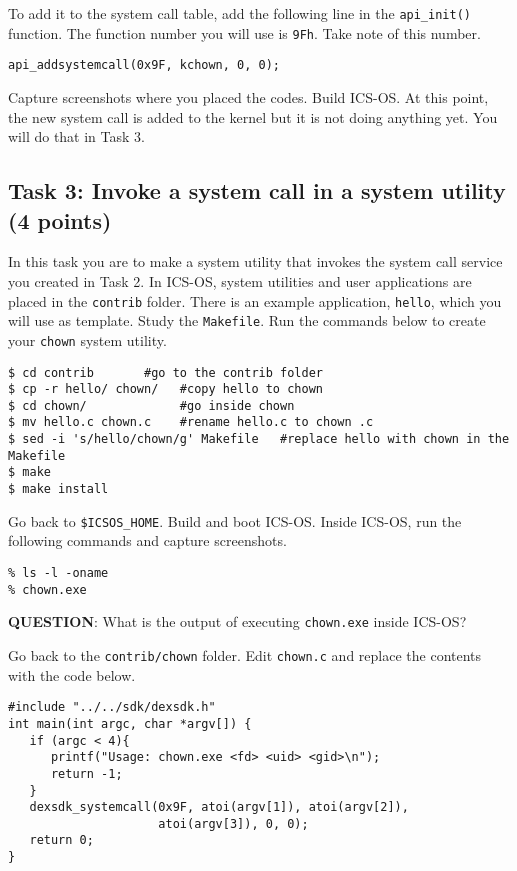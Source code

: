 \documentclass[a4paper, 11pt,oneside]{article}
\begin{document}
To add it to the system call table, add the following line in the \texttt{api\_init()} 
function. The function number you will use is \texttt{9Fh}. Take note of this number.

\begin{Verbatim}[frame=single]
api_addsystemcall(0x9F, kchown, 0, 0);
\end{Verbatim} 

Capture screenshots where you placed the codes. 
Build ICS-OS. At this point, the new system call is added to the kernel but it is not 
doing anything yet. You will do that in Task 3. 

\subsection*{Task 3: Invoke a system call in a system utility (4 points)}
In this task you are to make a system utility that invokes the system call service  
you created in Task 2. In ICS-OS, system utilities and user applications are 
placed in the \texttt{contrib} folder. There is an example application, 
\texttt{hello}, which you will use as template. Study the \texttt{Makefile}. 
Run the commands below to create your \texttt{chown} system utility.  

\begin{Verbatim}[frame=single]
$ cd contrib	   #go to the contrib folder
$ cp -r hello/ chown/   #copy hello to chown
$ cd chown/             #go inside chown
$ mv hello.c chown.c    #rename hello.c to chown .c
$ sed -i 's/hello/chown/g' Makefile   #replace hello with chown in the Makefile
$ make
$ make install
\end{Verbatim}

Go back to \texttt{\$ICSOS\_HOME}. Build and boot ICS-OS. 
Inside ICS-OS, run the following commands and capture screenshots.

\begin{Verbatim}[frame=single]
% cd apps
% ls -l -oname
% chown.exe
\end{Verbatim}

\textbf{QUESTION}: What is the output of executing \texttt{chown.exe} inside ICS-OS?

Go back to the \texttt{contrib/chown} folder. Edit \texttt{chown.c} and replace 
the contents with the code below. 

\begin{Verbatim}[frame=single]
#include "../../sdk/dexsdk.h"
int main(int argc, char *argv[]) {
   if (argc < 4){ 
      printf("Usage: chown.exe <fd> <uid> <gid>\n");
      return -1; 
   }   
   dexsdk_systemcall(0x9F, atoi(argv[1]), atoi(argv[2]), 
                     atoi(argv[3]), 0, 0); 
   return 0;
}
\end{Verbatim}
\end{document}
